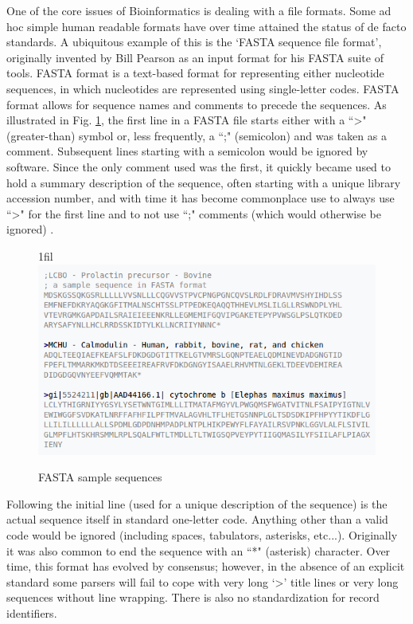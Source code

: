 \documentclass[12pt,openany]{llncs}
\makeatletter
\newcommand*{\centerfloat}{%
  \parindent \z@
  \leftskip \z@ \@plus 1fil \@minus \textwidth
  \rightskip\leftskip
  \parfillskip \z@skip}
\makeatother
\begin{document}
\newpage
One of the core issues of Bioinformatics is dealing with a file formats. Some ad hoc simple human readable formats have over time attained the status of de facto standards. A ubiquitous example of this is the ‘FASTA sequence file format’, originally invented by Bill Pearson as an input format for his FASTA suite of tools.
FASTA format is a text-based format for representing either nucleotide sequences, in which nucleotides are represented using single-letter codes. FASTA format allows for sequence names and comments to precede the sequences. As illustrated in Fig. \ref{fig:fig-NGS-5}, the first line in a FASTA file starts either with a ``\textgreater" (greater-than) symbol or, less frequently, a ``;" (semicolon) and was taken as a comment. Subsequent lines starting with a semicolon would be ignored by software. Since the only comment used was the first, it quickly became used to hold a summary description of the sequence, often starting with a unique library accession number, and with time it has become commonplace use to always use ``\textgreater" for the first line and to not use ``;" comments (which would otherwise be ignored) \cite{fasta-fastq1}.
\begin{figure}
	\centerfloat
	\includegraphics[width=1\linewidth]{./figs/NGS-5}
	\caption{\label{fig:fig-NGS-5}FASTA sample sequences}
\end{figure}
Following the initial line (used for a unique description of the sequence) is the actual sequence itself in standard one-letter code. Anything other than a valid code would be ignored (including spaces, tabulators, asterisks, etc...). Originally it was also common to end the sequence with an ``*" (asterisk) character. 
Over time, this format has evolved by consensus; however, in the absence of an explicit standard some parsers will fail to cope with very long ‘\textgreater’ title lines or very long sequences without line wrapping. There is also no standardization for record identifiers.
\end{document}
